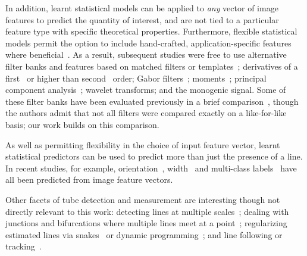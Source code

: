 In addition, learnt statistical models can be applied to \emph{any} vector of image features to predict the quantity of interest, and are not tied to a particular feature type with specific theoretical properties. Furthermore, flexible statistical models permit the option to include hand-crafted, application-specific features where beneficial~\cite{Staal_etal_TMI04}. As a result, subsequent studies were free to use alternative filter banks and features based on %
matched filters or templates~\cite{Chaudhuri_etal_TMI89,Pechaud_etal_CVPR09,Dixon_Taylor_IPC79,Hoover_etal_TMI00,Ricci_Perfetti_TMI07}; %
derivatives of a first~\cite{Cai_Chung_MICCAI06} or higher than second~\cite{Gonzalez_etal_CVPR09} order; %
Gabor filters~\cite{Soares_etal_TMI06,Dabbah_etal_MIA11}; %
moments~\cite{Marin_etal_TMI11}; %
principal component analysis~\cite{Minh_Hinton_ECCV10}; %
wavelet transforms; %
and the monogenic signal. %
Some of these filter banks have been evaluated previously in a brief comparison~\cite{Ayres_Rangayyan_JEI07}, though the authors admit that not all filters were compared exactly on a like-for-like basis; our work builds on this comparison.

As well as permitting flexibility in the choice of input feature vector, learnt statistical predictors can be used to predict more than just the presence of a line. In recent studies, for example, orientation~\cite{Zwiggelaar_etal_TMI04,Ayres_Rangayyan_JEI07}, width~\cite{Steger_TPAMI98,Zwiggelaar_etal_TMI04} and multi-class labels~\cite{Zwiggelaar_etal_TMI04} have all been predicted from image feature vectors.

Other facets of tube detection and measurement are interesting though not directly relevant to this work: %
detecting lines at multiple scales~\cite{Lindeberg_IJCV98,Sato_etal_MIA98}; %
dealing with junctions and bifurcations where multiple lines meet at a point~\cite{Chen_etal_TPAMI00};
regularizing estimated lines via snakes~\cite{Laptev_etal_MVA00} or dynamic programming~\cite{Gruen}; %
and line following or tracking~\cite{Aylward_Bullitt_TMI02,Perez_etal_ICCV01}.

